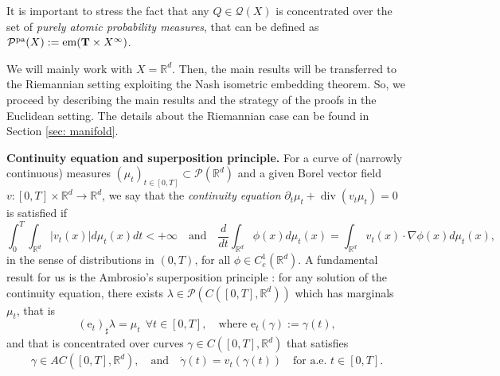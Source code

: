 \documentclass[10pt,leqno]{amsart}
\numberwithin{equation}{section}
\newcommand{\R}{\mathbb{R}}
\newcommand{\PP}{\mathcal{P}}
\newcommand{\PPpa}{\PP^{\operatorname{pa}}}
\newcommand{\e}{\mathrm{e}}
\newcommand{\ttg}{\mathtt{g}}
\newcommand{\Ss}{\mathbb{S}}
\begin{document}
It is important to stress the fact that any $Q \in \mathcal{Q}(X)$ is concentrated over the set of \textit{purely atomic probability measures}, that can be defined as $\PPpa(X):= \operatorname{em}(\bold{T}\times X^\infty)$.

We will mainly work with $X = \R^d$. Then, the main results will be transferred to the Riemannian setting exploiting the Nash isometric embedding theorem. So, we proceed by describing the main results and the strategy of the proofs in the Euclidean setting. The details about the Riemannian case can be found in Section \ref{sec: manifold}.

\bigskip 

\noindent \textbf{Continuity equation and superposition principle.}
For a curve of (narrowly continuous) measures $(\mu_t)_{t\in[0,T]}\subset \PP(\R^d)$ and a given Borel vector field $v:[0,T]\times \R^d \to \R^d$, we say that the \textit{continuity equation} $\partial_t\mu_t + \operatorname{div}(v_t\mu_t) = 0$ is satisfied if 
\begin{equation}\label{eq: CE intro}
    \int_0^T \int_{\R^d} |v_t(x)|d\mu_t(x) dt <+\infty \quad \text{and} \quad \frac{d}{dt}\int_{\R^d}\phi(x) d\mu_t(x) = \int_{\R^d} v_t(x)\cdot \nabla\phi(x) d\mu_t(x),
\end{equation}
in the sense of distributions in $(0,T)$, for all $\phi \in C_c^{1}(\R^d)$. A fundamental result for us is the Ambrosio's superposition principle \cite[Theorem 8.2.1]{ambrosio2005gradient}: for any solution of the continuity equation, there exists $\lambda \in \PP(C([0,T],\R^d))$ which has marginals $\mu_t$, that is
\begin{equation}\label{eq: marginal intro}
    (\e_t)_\sharp \lambda = \mu_t \ \ \forall t\in[0,T], \quad \text{where } \e_t(\gamma):= \gamma(t),
\end{equation}
and that is concentrated over curves $\gamma \in C([0,T],\R^d)$ that satisfies
\begin{equation}\label{eq: ODE intro}
    \gamma\in AC([0,T],\R^d), \quad \text{and} \quad \dot{\gamma}(t) = v_t(\gamma(t)) \quad \text{for a.e. } t\in[0,T]. 
\end{equation}
\end{document}
